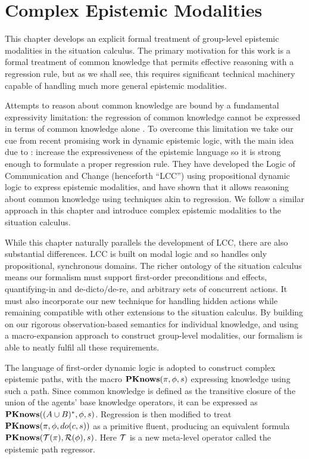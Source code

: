 

\chapter{Complex Epistemic Modalities}

\label{ch:cknowledge}

This chapter develops an explicit formal treatment of group-level
epistemic modalities in the situation calculus. The primary motivation
for this work is a formal treatment of common knowledge that permits
effective reasoning with a regression rule, but as we shall see, this
requires significant technical machinery capable of handling much
more general epistemic modalities.

Attempts to reason about common knowledge are bound by a fundamental
expressivity limitation: the regression of common knowledge cannot
be expressed in terms of common knowledge alone \citep{baltag98pa_ck}.
To overcome this limitation we take our cue from recent promising
work in dynamic epistemic logic, with the main idea due to \citet{vanBenthem06lcc}:
increase the expressiveness of the epistemic language so it is strong
enough to formulate a proper regression rule. They have developed
the Logic of Communication and Change (henceforth {}``LCC'') using
propositional dynamic logic to express epistemic modalities, and have
shown that it allows reasoning about common knowledge using techniques
akin to regression. We follow a similar approach in this chapter and
introduce complex epistemic modalities to the situation calculus.

While this chapter naturally parallels the development of LCC, there
are also substantial differences. LCC is built on modal logic and
so handles only propositional, synchronous domains. The richer ontology
of the situation calculus means our formalism must support first-order
preconditions and effects, quantifying-in and de-dicto/de-re, and
arbitrary sets of concurrent actions. It must also incorporate our
new technique for handling hidden actions while remaining compatible
with other extensions to the situation calculus. By building on our
rigorous observation-based semantics for individual knowledge, and
using a macro-expansion approach to construct group-level modalities,
our formalism is able to neatly fulfil all these requirements.

The language of first-order dynamic logic is adopted to construct
complex epistemic paths, with the macro $\mathbf{PKnows}(\pi,\phi,s)$ expressing
knowledge using such a path. Since common knowledge is defined as
the transitive closure of the union of the agents' base knowledge
operators, it can be expressed as $\mathbf{PKnows}((A\cup B)^{*},\phi,s)$.
Regression is then modified to treat $\mathbf{PKnows}(\pi,\phi,do(c,s))$
as a primitive fluent, producing an equivalent formula $\mathbf{PKnows}(\mathcal{T}(\pi),\mathcal{R}(\phi),s)$.
Here $\mathcal{T}$ is a new meta-level operator called the epistemic path
regressor.


